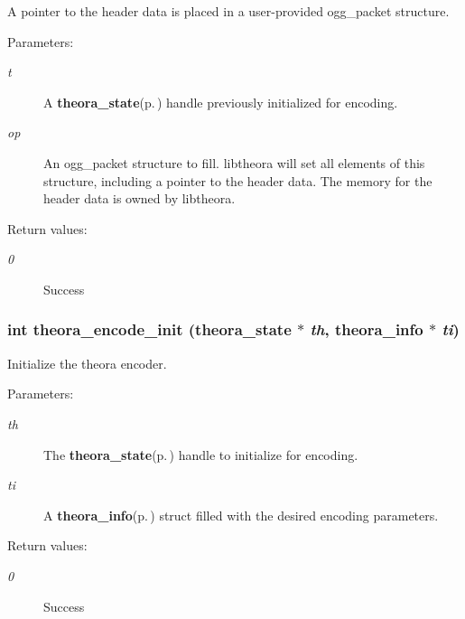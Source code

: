 A pointer to the header data is placed in a user-provided ogg\_\-packet structure. \begin{Desc}
\item[Parameters:]
\begin{description}
\item[{\em t}]A {\bf theora\_\-state}{\rm (p.\,\pageref{structtheora__state})} handle previously initialized for encoding. \item[{\em op}]An ogg\_\-packet structure to fill. libtheora will set all elements of this structure, including a pointer to the header data. The memory for the header data is owned by libtheora. \end{description}
\end{Desc}
\begin{Desc}
\item[Return values:]
\begin{description}
\item[{\em 0}]Success \end{description}
\end{Desc}
\subsubsection{\setlength{\rightskip}{0pt plus 5cm}int theora\_\-encode\_\-init ({\bf theora\_\-state} $\ast$ {\em th}, {\bf theora\_\-info} $\ast$ {\em ti})}\label{theora_8h_9544a8feccd8a25e6336a57eac2c411e}


Initialize the theora encoder. 

\begin{Desc}
\item[Parameters:]
\begin{description}
\item[{\em th}]The {\bf theora\_\-state}{\rm (p.\,\pageref{structtheora__state})} handle to initialize for encoding. \item[{\em ti}]A {\bf theora\_\-info}{\rm (p.\,\pageref{structtheora__info})} struct filled with the desired encoding parameters. \end{description}
\end{Desc}
\begin{Desc}
\item[Return values:]
\begin{description}
\item[{\em 0}]Success \end{description}
\end{Desc}
